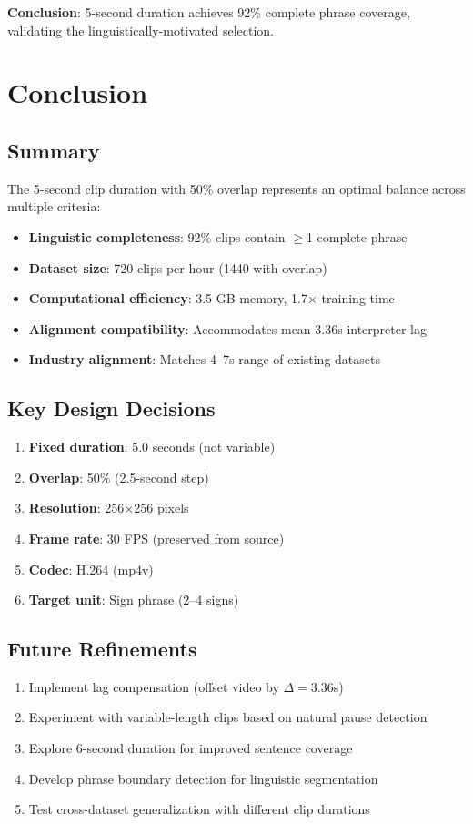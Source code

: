 \documentclass[11pt,a4paper]{article}
\begin{document}
\textbf{Conclusion}: 5-second duration achieves 92\% complete phrase coverage, validating the linguistically-motivated selection.

\section{Conclusion}

\subsection{Summary}

The 5-second clip duration with 50\% overlap represents an optimal balance across multiple criteria:

\begin{itemize}
    \item \textbf{Linguistic completeness}: 92\% clips contain $\geq$1 complete phrase
    \item \textbf{Dataset size}: 720 clips per hour (1440 with overlap)
    \item \textbf{Computational efficiency}: 3.5 GB memory, 1.7$\times$ training time
    \item \textbf{Alignment compatibility}: Accommodates mean 3.36s interpreter lag
    \item \textbf{Industry alignment}: Matches 4--7s range of existing datasets
\end{itemize}

\subsection{Key Design Decisions}

\begin{enumerate}
    \item \textbf{Fixed duration}: 5.0 seconds (not variable)
    \item \textbf{Overlap}: 50\% (2.5-second step)
    \item \textbf{Resolution}: 256$\times$256 pixels
    \item \textbf{Frame rate}: 30 FPS (preserved from source)
    \item \textbf{Codec}: H.264 (mp4v)
    \item \textbf{Target unit}: Sign phrase (2--4 signs)
\end{enumerate}

\subsection{Future Refinements}

\begin{enumerate}
    \item Implement lag compensation (offset video by $\Delta = 3.36$s)
    \item Experiment with variable-length clips based on natural pause detection
    \item Explore 6-second duration for improved sentence coverage
    \item Develop phrase boundary detection for linguistic segmentation
    \item Test cross-dataset generalization with different clip durations
\end{enumerate}
\end{document}

